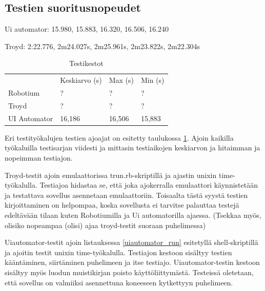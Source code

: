\subsection{Testien suoritusnopeudet}

Ui automator: 15.980, 15.883, 16.320, 16.506, 16.240

Troyd: 2:22.776, 2m24.027s, 2m25.961s, 2m23.822s, 2m22.304s

\begin{table}[h]
\centering
\begin{tabular}{ l l l l }
   & Keskiarvo (s) & Max (s) & Min (s) \\
  Robotium & ? & ? & ? \\
  Troyd & ? & ? & ? \\
  UI Automator & 16,186 & 16,506 & 15,883 \\
\end{tabular}
\caption{Testikestot}
\label{uitest_timing}
\end{table}

Eri testityökalujen testien ajoajat on esitetty taulukossa \ref{uitest_timing}. Ajoin kaikilla työkaluilla testisarjan viidesti ja mittasin testiaikojen keskiarvon ja hitaimman ja nopeimman testiajon.

Troyd-testit ajoin emulaattorissa trun.rb-skriptillä ja ajastin unixin time-työkalulla. Testiajoa hidastaa se, että joka ajokerralla emulaattori käynnistetään ja testattava sovellus asennetaan emulaattoriin. Toisaalta tästä syystä testien kirjoittaminen on helpompaa, koska sovellusta ei tarvitse palauttaa testejä edeltävään tilaan kuten Robotiumilla ja Ui automatorilla ajaessa. (Tsekkaa myös, olisiko nopeampaa (olisi) ajaa troyd-testit suoraan puhelimessa)

Uiautomator-testit ajoin listauksessa \ref{uiautomator_run} esitetyllä shell-skriptillä ja ajoitin testit unixin time-työkalulla. Testiajon kestoon sisältyy testien kääntäminen, siirtäminen puhelimeen ja itse testiajo. Uiautomator-testin kestoon sisältyy myös luodun muistikirjan poisto käyttöliittymästä. Testeissä oletetaan, että sovellus on valmiiksi asennettuna koneeseen kytkettyyn puhelimeen.